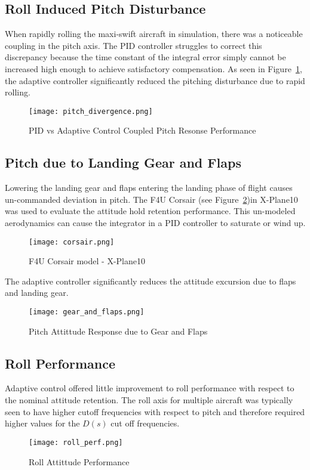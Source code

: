 \subsection{Roll Induced Pitch Disturbance}
When rapidly rolling the maxi-swift aircraft in simulation, there was a noticeable coupling in the pitch axis.  The \ac{PID} controller struggles to correct this discrepancy because the time constant of the integral error simply cannot be increased high enough to achieve satisfactory compensation.  As seen in Figure~\ref{fig:pitch_divergence}, the \Lone adaptive controller significantly reduced the pitching disturbance due to rapid rolling.

\begin{figure}[h!]
 \centering
  \texttt{[image: pitch\_divergence.png]}
  \caption{PID vs \Lone Adaptive Control Coupled Pitch Resonse Performance}
  \label{fig:pitch_divergence}
\end{figure}

\subsection{Pitch due to Landing Gear and Flaps}
Lowering the landing gear and flaps entering the landing phase of flight causes un-commanded deviation in pitch.  The F4U Corsair (see Figure~\ref{fig:corsair})in X-Plane10 was used to evaluate the attitude hold retention performance.  This un-modeled aerodynamics can cause the integrator in a \ac{PID} controller to saturate or wind up. 

\begin{figure}[h!]
 \centering
  \texttt{[image: corsair.png]}
  \caption{F4U Corsair model - X-Plane10}
  \label{fig:corsair}
\end{figure}

The \Lone adaptive controller significantly reduces the attitude excursion due to flaps and landing gear.
\begin{figure}[h!]
 \centering
  \texttt{[image: gear\_and\_flaps.png]}
  \caption{Pitch Attittude Response due to Gear and Flaps}
  \label{fig:gear_and_flaps}
\end{figure}

\subsection{Roll Performance}
Adaptive control offered little improvement to roll performance with respect to the nominal attitude retention.  The roll axis for multiple aircraft was typically seen to have higher cutoff frequencies with respect to pitch and therefore required higher values for the $D(s)$ cut off frequencies.
\begin{figure}[h!]
 \centering
  \texttt{[image: roll\_perf.png]}
  \caption{Roll Attittude Performance}
  \label{fig:roll_perf}
\end{figure}

